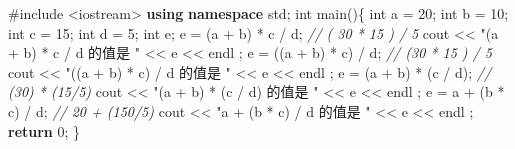 \documentclass[
]{article}
\newenvironment{Shaded}{}{}
\newcommand{\CommentTok}[1]{\textcolor[rgb]{0.38,0.63,0.69}{\textit{#1}}}
\newcommand{\ControlFlowTok}[1]{\textcolor[rgb]{0.00,0.44,0.13}{\textbf{#1}}}
\newcommand{\DataTypeTok}[1]{\textcolor[rgb]{0.56,0.13,0.00}{#1}}
\newcommand{\DecValTok}[1]{\textcolor[rgb]{0.25,0.63,0.44}{#1}}
\newcommand{\ImportTok}[1]{#1}
\newcommand{\KeywordTok}[1]{\textcolor[rgb]{0.00,0.44,0.13}{\textbf{#1}}}
\newcommand{\NormalTok}[1]{#1}
\newcommand{\OperatorTok}[1]{\textcolor[rgb]{0.40,0.40,0.40}{#1}}
\newcommand{\PreprocessorTok}[1]{\textcolor[rgb]{0.74,0.48,0.00}{#1}}
\newcommand{\StringTok}[1]{\textcolor[rgb]{0.25,0.44,0.63}{#1}}
\begin{document}
\begin{Shaded}
\begin{Highlighting}[]
\PreprocessorTok{\#include }\ImportTok{\textless{}iostream\textgreater{}}
\KeywordTok{using} \KeywordTok{namespace}\NormalTok{ std}\OperatorTok{;} 
\DataTypeTok{int}\NormalTok{ main}\OperatorTok{()\{}
   \DataTypeTok{int}\NormalTok{ a }\OperatorTok{=} \DecValTok{20}\OperatorTok{;}   \DataTypeTok{int}\NormalTok{ b }\OperatorTok{=} \DecValTok{10}\OperatorTok{;}   \DataTypeTok{int}\NormalTok{ c }\OperatorTok{=} \DecValTok{15}\OperatorTok{;}   \DataTypeTok{int}\NormalTok{ d }\OperatorTok{=} \DecValTok{5}\OperatorTok{;}   \DataTypeTok{int}\NormalTok{ e}\OperatorTok{;} 
\NormalTok{   e }\OperatorTok{=} \OperatorTok{(}\NormalTok{a }\OperatorTok{+}\NormalTok{ b}\OperatorTok{)} \OperatorTok{*}\NormalTok{ c }\OperatorTok{/}\NormalTok{ d}\OperatorTok{;}      \CommentTok{// ( 30 * 15 ) / 5}
\NormalTok{   cout }\OperatorTok{\textless{}\textless{}} \StringTok{"(a + b) * c / d 的值是 "} \OperatorTok{\textless{}\textless{}}\NormalTok{ e }\OperatorTok{\textless{}\textless{}}\NormalTok{ endl }\OperatorTok{;} 
\NormalTok{   e }\OperatorTok{=} \OperatorTok{((}\NormalTok{a }\OperatorTok{+}\NormalTok{ b}\OperatorTok{)} \OperatorTok{*}\NormalTok{ c}\OperatorTok{)} \OperatorTok{/}\NormalTok{ d}\OperatorTok{;}    \CommentTok{// (30 * 15 ) / 5}
\NormalTok{   cout }\OperatorTok{\textless{}\textless{}} \StringTok{"((a + b) * c) / d 的值是 "} \OperatorTok{\textless{}\textless{}}\NormalTok{ e }\OperatorTok{\textless{}\textless{}}\NormalTok{ endl }\OperatorTok{;} 
\NormalTok{   e }\OperatorTok{=} \OperatorTok{(}\NormalTok{a }\OperatorTok{+}\NormalTok{ b}\OperatorTok{)} \OperatorTok{*} \OperatorTok{(}\NormalTok{c }\OperatorTok{/}\NormalTok{ d}\OperatorTok{);}   \CommentTok{// (30) * (15/5)}
\NormalTok{   cout }\OperatorTok{\textless{}\textless{}} \StringTok{"(a + b) * (c / d) 的值是 "} \OperatorTok{\textless{}\textless{}}\NormalTok{ e }\OperatorTok{\textless{}\textless{}}\NormalTok{ endl }\OperatorTok{;} 
\NormalTok{   e }\OperatorTok{=}\NormalTok{ a }\OperatorTok{+} \OperatorTok{(}\NormalTok{b }\OperatorTok{*}\NormalTok{ c}\OperatorTok{)} \OperatorTok{/}\NormalTok{ d}\OperatorTok{;}     \CommentTok{//  20 + (150/5)}
\NormalTok{   cout }\OperatorTok{\textless{}\textless{}} \StringTok{"a + (b * c) / d 的值是 "} \OperatorTok{\textless{}\textless{}}\NormalTok{ e }\OperatorTok{\textless{}\textless{}}\NormalTok{ endl }\OperatorTok{;}  
   \ControlFlowTok{return} \DecValTok{0}\OperatorTok{;}
\OperatorTok{\}}
\end{Highlighting}
\end{Shaded}
\end{document}

